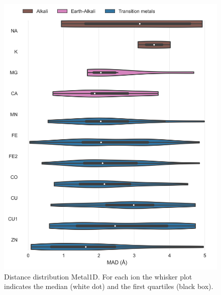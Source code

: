 \documentclass[ lineno,
  9pt]{elife}
\newenvironment{fignos:tagged-figure}[1][]{
  \let\oldthefigure\thefigure
  \let\oldtheHfigure\theHfigure
  \renewcommand{\thefigure}{#1}
  \renewcommand{\theHfigure}{#1}
}{
  \let\thefigure\oldthefigure
  \let\theHfigure\oldtheHfigure
  \addtocounter{figure}{-1}
}
\begin{document}
\begin{fignos:tagged-figure}[S4]

\begin{figure}
\hypertarget{fig:selectivity-distance-metal1d}{%
\centering
\includegraphics{images/model_0.5metal1D_distances_violin.jpg}
\caption{Distance distribution Metal1D. For each ion the whisker plot indicates the median (white dot) and the first quartiles (black box).}\label{fig:selectivity-distance-metal1d}
}
\end{figure}

\end{fignos:tagged-figure}
\end{document}
